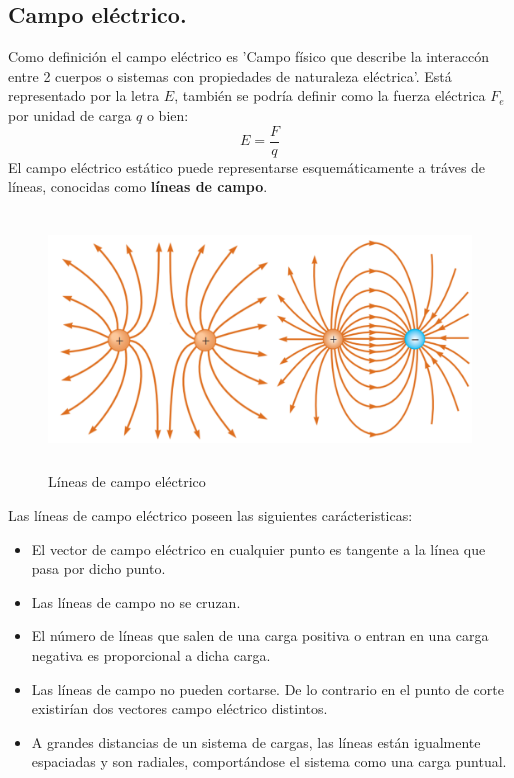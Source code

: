 \documentclass[11pt]{article}
\begin{document}
\subsection{Campo eléctrico.}
Como definición el campo eléctrico es 'Campo físico que describe la interaccón entre 2 cuerpos o sistemas con propiedades de naturaleza eléctrica'. Está representado por la letra $E$, también se podría definir como la fuerza eléctrica $F_{e}$  por unidad de carga $q$ o bien:
$$E=\frac{F}{q}$$
El campo eléctrico estático puede representarse esquemáticamente a tráves de líneas, conocidas como \textbf{líneas de campo}.
\begin{figure}[H]
\centering
\includegraphics[height=6.8cm]{Imagenes/Lineas_de_campo.png}
\caption{Líneas de campo eléctrico}\label{fig:Lineas de campo electrico}
\end{figure}
Las líneas de campo eléctrico poseen las siguientes carácteristicas:
\begin{itemize}
\item El vector de campo eléctrico en cualquier punto es tangente a la línea que pasa por dicho punto.
\item Las líneas de campo no se cruzan.
\item El número de líneas que salen de una carga positiva o entran en una carga negativa es proporcional a dicha carga.
\item Las líneas de campo no pueden cortarse. De lo contrario en el punto de corte existirían dos vectores campo eléctrico distintos.
\item A grandes distancias de un sistema de cargas, las líneas están igualmente espaciadas y son radiales, comportándose el sistema como una carga puntual.
\end{itemize}
\end{document}
